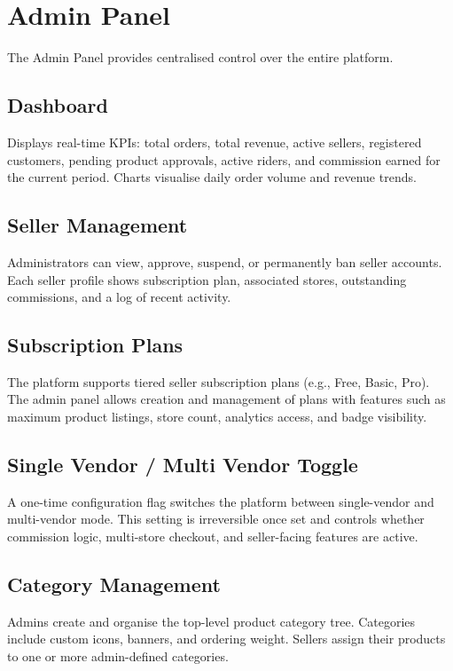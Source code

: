 \documentclass[12pt, a4paper, oneside]{report}
\begin{document}
\section{Admin Panel}

The Admin Panel provides centralised control over the entire platform.

\subsection{Dashboard}

Displays real-time KPIs: total orders, total revenue, active sellers, registered
customers, pending product approvals, active riders, and commission earned for
the current period. Charts visualise daily order volume and revenue trends.

\subsection{Seller Management}

Administrators can view, approve, suspend, or permanently ban seller accounts.
Each seller profile shows subscription plan, associated stores, outstanding
commissions, and a log of recent activity.

\subsection{Subscription Plans}

The platform supports tiered seller subscription plans (e.g., Free, Basic,
Pro). The admin panel allows creation and management of plans with features
such as maximum product listings, store count, analytics access, and badge
visibility.

\subsection{Single Vendor / Multi Vendor Toggle}

A one-time configuration flag switches the platform between single-vendor and
multi-vendor mode. This setting is irreversible once set and controls whether
commission logic, multi-store checkout, and seller-facing features are active.

\subsection{Category Management}

Admins create and organise the top-level product category tree. Categories
include custom icons, banners, and ordering weight. Sellers assign their products
to one or more admin-defined categories.
\end{document}
